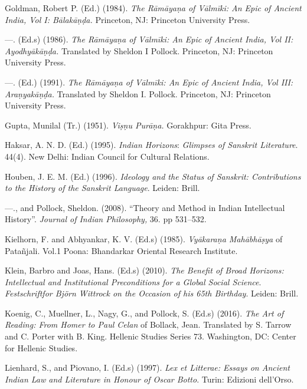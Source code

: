 \begin{thebibliography}{99}
 \item Goldman, Robert P. (Ed.) (1984). \textit{The Rāmāyaṇa of Vālmīki: An Epic of Ancient India, Vol I: Bālakāṇḍa. }Princeton, NJ: Princeton University Press.

 \item —. (Ed.s) (1986).\textit{ The Rāmāyaṇa of Vālmīki: An Epic of Ancient India, Vol II: Ayodhyākāṇḍa. }Translated by Sheldon I Pollock. Princeton, NJ: Princeton University Press.

 \item —. (Ed.) (1991). \textit{The Rāmāyaṇa of Vālmīki: An Epic of Ancient India, Vol III: Araṇyakāṇḍa.} Translated by Sheldon I. Pollock. Princeton, NJ: Princeton University Press.

 \item Gupta, Munilal (Tr.) (1951). \textit{Viṣṇu Purāṇa.} Gorakhpur: Gita Press.

 \item Haksar, A. N. D. (Ed.) (1995). \textit{Indian Horizons}: \textit{Glimpses of Sanskrit Literature}. 44(4). New Delhi: Indian Council for Cultural Relations.

 \item Houben, J. E. M. (Ed.) (1996). \textit{Ideology and the Status of Sanskrit: Contributions to the History of the Sanskrit Language}. Leiden: Brill.

 \item —., and Pollock, Sheldon. (2008). “Theory and Method in Indian Intellectual History”.\textit{ Journal of Indian Philosophy, }36. pp 531–532.

 \item Kielhorn, F. and Abhyankar, K. V. (Ed.s) (1985). \textit{Vyākaraṇa Mahābhāṣya} of Patañjali. Vol.1 Poona: Bhandarkar Oriental Research Institute.

 \item Klein, Barbro and Joas, Hans. (Ed.s) (2010).\textit{ The Benefit of Broad Horizons: Intellectual and Institutional Preconditions for a Global Social Science}. \textit{Festschriftfor Björn Wittrock on the Occasion of his 65th Birthday}. Leiden: Brill.

 \item Koenig, C., Muellner, L., Nagy, G., and Pollock, S. (Ed.s) (2016). \textit{The Art of Reading: From Homer to Paul Celan} of Bollack, Jean. Translated by S. Tarrow and C. Porter with B. King. Hellenic Studies Series 73. Washington, DC: Center for Hellenic Studies.

 \item Lienhard, S., and Piovano, I. (Ed.s) (1997). \textit{Lex et Litterae: Essays on Ancient Indian Law and Literature in Honour of Oscar Botto}. Turin: Edizioni dell’Orso.


\end{thebibliography}
